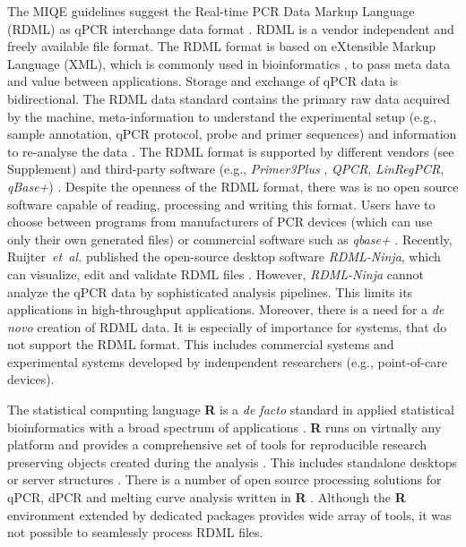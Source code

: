 \documentclass{bioinfo}
\begin{document}
The MIQE guidelines suggest the Real-time PCR Data Markup Language (RDML) as 
qPCR interchange data format \cite{rdml-ninja_2015}. RDML is a vendor 
independent and freely available file format. The RDML format is based on 
eXtensible Markup Language (XML), which is commonly used in bioinformatics 
\cite{achard_xml_2001}, to pass meta data and value between applications. 
Storage and exchange of qPCR data is bidirectional. The RDML data standard 
contains the primary raw data acquired by the machine, meta-information to 
understand the experimental setup (e.g., sample annotation, qPCR protocol, probe 
and primer sequences) and information to re-analyse the data 
\cite{lefever_rdml_2009}. The RDML format is supported by different vendors (see 
Supplement) and third-party software (e.g., \textit{Primer3Plus} 
\cite{untergasser_2007}, \textit{QPCR}, \textit{LinRegPCR}, \textit{qBase+}) 
\cite{pabinger_2014, rdml-ninja_2015}. Despite the openness of the RDML format, 
there was is no open source software capable of reading, processing and writing 
this format. Users have to choose between programs from manufacturers of PCR 
devices (which can use only their own generated files) or commercial software 
such as \textit{qbase+} \cite{pabinger_2014, rdml-ninja_2015}. Recently, 
Ruijter~\textit{et~al.} published the open-source desktop software 
\textit{RDML-Ninja}, which can visualize, edit and validate RDML files 
\cite{rdml-ninja_2015}. However, \textit{RDML-Ninja} cannot analyze the qPCR 
data by sophisticated analysis pipelines. This limits its applications in 
high-throughput applications. Moreover, there is a need for a \textit{de novo} 
creation of RDML data.  It is especially of importance for systems, that do not 
support the RDML format. This includes commercial systems and experimental 
systems developed by indenpendent researchers (e.g.,  point-of-care devices). 

The statistical computing language \textbf{R} is a \textit{de facto} standard in applied 
statistical bioinformatics with a broad spectrum of applications 
\cite{gentleman_2004}. \textbf{R} runs on virtually any platform 
and provides a comprehensive set of tools for reproducible research preserving 
objects created during the analysis \cite{leeper_archiving_2014, liu_r_2014, roediger2015r,roediger2015chippcr}. 
This includes standalone desktops or server structures \cite{roediger2015r}. 
There is a number of open source processing solutions for qPCR, dPCR and melting 
curve analysis written in \textbf{R} \cite{pabinger_2014, ritz_qpcr_2008, 
roediger_RJ_2013, roediger2015chippcr}. Although the \textbf{R} environment 
extended by dedicated packages provides wide array of tools, it was not possible 
to seamlessly process RDML files.
\end{document}
